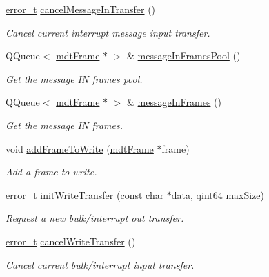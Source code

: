 \begin{DoxyCompactItemize}
\hyperlink{classmdt_abstract_port_ad4121bb930c95887e77f8bafa065a85e}{error\-\_\-t} \hyperlink{classmdt_usb_port_afddcb02a1e2bd87609fd2b6305534560}{cancel\-Message\-In\-Transfer} ()
\begin{DoxyCompactList}\small\item\em Cancel current interrupt message input transfer. \end{DoxyCompactList}\item 
Q\-Queue$<$ \hyperlink{classmdt_frame}{mdt\-Frame} $\ast$ $>$ \& \hyperlink{classmdt_usb_port_a3ad4385983122fcaf6d2560b6bd43acf}{message\-In\-Frames\-Pool} ()
\begin{DoxyCompactList}\small\item\em Get the message I\-N frames pool. \end{DoxyCompactList}\item 
Q\-Queue$<$ \hyperlink{classmdt_frame}{mdt\-Frame} $\ast$ $>$ \& \hyperlink{classmdt_usb_port_a3365431076a3197540cbc99278658bda}{message\-In\-Frames} ()
\begin{DoxyCompactList}\small\item\em Get the message I\-N frames. \end{DoxyCompactList}\item 
void \hyperlink{classmdt_usb_port_a38200f806037e06988e73af246e8a494}{add\-Frame\-To\-Write} (\hyperlink{classmdt_frame}{mdt\-Frame} $\ast$frame)
\begin{DoxyCompactList}\small\item\em Add a frame to write. \end{DoxyCompactList}\item 
\hyperlink{classmdt_abstract_port_ad4121bb930c95887e77f8bafa065a85e}{error\-\_\-t} \hyperlink{classmdt_usb_port_a3340dc3f53e857e39053988e4925fc97}{init\-Write\-Transfer} (const char $\ast$data, qint64 max\-Size)
\begin{DoxyCompactList}\small\item\em Request a new bulk/interrupt out transfer. \end{DoxyCompactList}\item 
\hyperlink{classmdt_abstract_port_ad4121bb930c95887e77f8bafa065a85e}{error\-\_\-t} \hyperlink{classmdt_usb_port_a7cbe1cd3649861aac5e6a14830f06cf9}{cancel\-Write\-Transfer} ()
\begin{DoxyCompactList}\small\item\em Cancel current bulk/interrupt input transfer. \end{DoxyCompactList}\item 

\end{DoxyCompactItemize}
